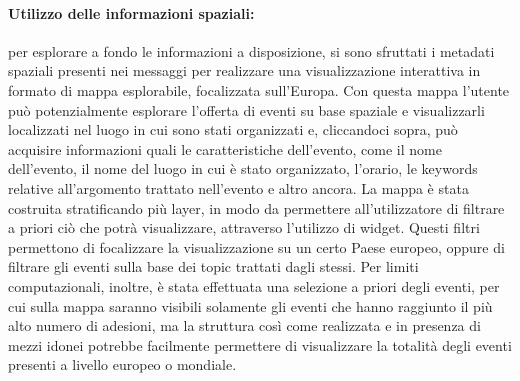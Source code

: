 \documentclass[fleqn,10pt]{SelfArx} %
\begin{document}
{\paragraph{Utilizzo delle informazioni spaziali:}
per esplorare a fondo le informazioni a disposizione, si sono sfruttati i metadati spaziali presenti nei messaggi per realizzare una visualizzazione interattiva in formato di mappa esplorabile, focalizzata sull'Europa. 
Con questa mappa l'utente può potenzialmente esplorare l'offerta di eventi su base spaziale e visualizzarli localizzati nel luogo in cui sono stati organizzati e, cliccandoci sopra, può acquisire informazioni quali le caratteristiche dell'evento, come il nome dell'evento, il nome del luogo in cui è stato organizzato, l'orario, le keywords relative all'argomento trattato nell'evento e altro ancora. 
La mappa è stata costruita stratificando più layer, in modo da permettere all'utilizzatore di filtrare a priori ciò che potrà visualizzare, attraverso l'utilizzo di widget. 
Questi filtri permettono di focalizzare la visualizzazione su un certo Paese europeo, oppure di filtrare gli eventi sulla base dei topic trattati dagli stessi. 
Per limiti computazionali, inoltre, è stata effettuata una selezione a priori degli eventi, per cui sulla mappa saranno visibili solamente gli eventi che hanno raggiunto il più alto numero di adesioni, ma la struttura così come realizzata e in presenza di mezzi idonei potrebbe facilmente permettere di visualizzare la totalità degli eventi presenti a livello europeo o mondiale.
}
\end{document}
